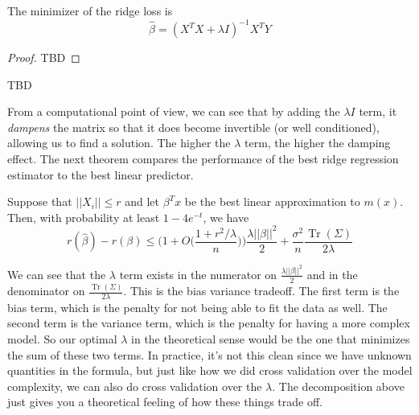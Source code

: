 \documentclass{article}
\DeclareMathOperator{\Tr}{Tr}
\begin{document}
    \begin{theorem}
      The minimizer of the ridge loss is 
      \begin{equation}
        \hat{\beta} = (X^T X+ \lambda I)^{-1} X^T Y
      \end{equation}
    \end{theorem}
    \begin{proof}
      TBD
    \end{proof}

    \begin{theorem}
      TBD 
    \end{theorem}

    From a computational point of view, we can see that by adding the $\lambda I$ term, it \textit{dampens} the matrix so that it does become invertible (or well conditioned), allowing us to find a solution. The higher the $\lambda$ term, the higher the damping effect. The next theorem compares the performance of the best ridge regression estimator to the best linear predictor. 

    \begin{theorem} 
      Suppose that $||X_i|| \leq r$ and let $\beta^T x$ be the best linear approximation to $m(x)$. Then, with probability at least $1 - 4 e^{-t}$, we have
      \begin{equation}
        r(\hat{\beta}) - r(\beta) \leq \bigg( 1 + O \bigg( \frac{1 + r^2 / \lambda}{n} \bigg) \bigg) \frac{\lambda ||\beta||^2}{2} + \frac{\sigma^2}{n} \frac{\Tr(\Sigma)}{2 \lambda}
      \end{equation}
    \end{theorem}

    We can see that the $\lambda$ term exists in the numerator on $\frac{\lambda ||\beta||^2}{2}$ and in the denominator on $\frac{\Tr(\Sigma)}{2 \lambda}$. This is the bias variance tradeoff. The first term is the bias term, which is the penalty for not being able to fit the data as well. The second term is the variance term, which is the penalty for having a more complex model. So our optimal $\lambda$ in the theoretical sense would be the one that minimizes the sum of these two terms. In practice, it's not this clean since we have unknown quantities in the formula, but just like how we did cross validation over the model complexity, we can also do cross validation over the $\lambda$. The decomposition above just gives you a theoretical feeling of how these things trade off. 
\end{document}
